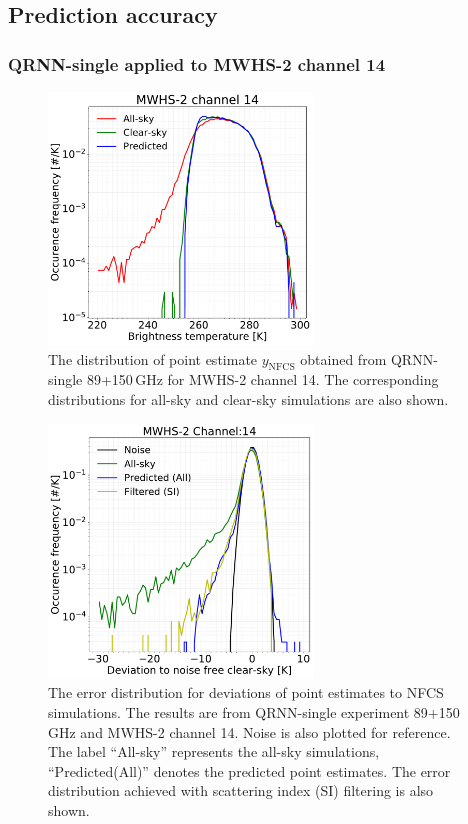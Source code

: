 \documentclass[amt, manuscript]{copernicus}
\newcommand{\ynfcs}{y_\text{NFCS}}
\begin{document}
  

\subsection{Prediction accuracy}

\subsubsection{QRNN-single applied to MWHS-2 channel 14} 
\begin{figure}[t]
	\centering
	\includegraphics[width = 70mm]{Figures/QRNN_output_mwhs.pdf} 
	\caption{The distribution of point estimate $\ynfcs$ obtained from QRNN-single 89+150\,GHz for MWHS-2 channel 14. The corresponding distributions for all-sky and clear-sky simulations are also shown.}
	\label{fig:distribution_predicted_mwhs14}	
\end{figure}
\begin{figure}[t]
	\centering
	\includegraphics[width = 70mm]{Figures/MWHS_error_dist_14.pdf} 
	\caption{The error distribution for deviations of point estimates to NFCS simulations. The results are from QRNN-single experiment 89+150\,GHz and MWHS-2 channel 14. Noise is also plotted for reference. The label ``All-sky'' represents the all-sky simulations, ``Predicted(All)'' denotes the predicted point estimates. The error distribution achieved with scattering index (SI) filtering is also shown. }
	\label{fig:error_distribution_mwhs14}	
\end{figure}
\end{document}
